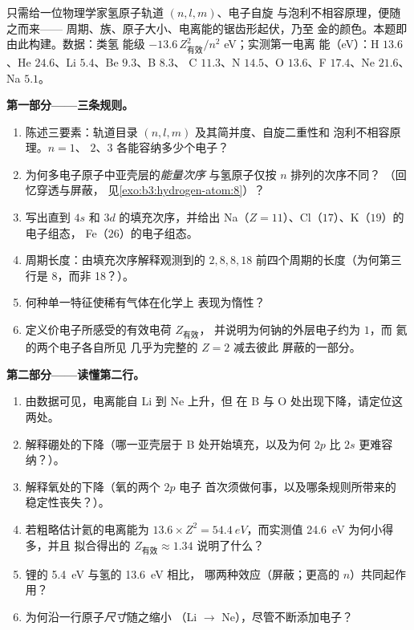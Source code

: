 \begin{problem}\label{pb:b3:identical-particles:1}
只需给一位物理学家氢原子轨道 $(n, l, m)$、电子自旋
与泡利不相容原理，便随之而来——
周期、族、原子大小、电离能的锯齿形起伏，乃至
金的颜色。本题即由此构建。数据：类氢
能级 $-13.6\,Z_{\text{有效}}^2/n^2$ eV；实测第一电离
能（eV）：H $13.6$、He $24.6$、Li $5.4$、Be $9.3$、B $8.3$、
C $11.3$、N $14.5$、O $13.6$、F $17.4$、Ne $21.6$、Na $5.1$。

\medskip\noindent\textbf{第一部分——三条规则。}
\begin{enumerate}
  \item 陈述三要素：轨道目录
        $(n, l, m)$ 及其简并度、自旋二重性和
        泡利不相容原理。$n = 1$、
        $2$、$3$ 各能容纳多少个电子？
  \item 为何多电子原子中亚壳层的\emph{能量次序}
        与氢原子仅按 $n$ 排列的次序不同？
        （回忆穿透与屏蔽，
        见\cref{exo:b3:hydrogen-atom:8}）？
  \item 写出直到 $4s$ 和 $3d$ 的填充次序，并给出
        Na（$Z = 11$）、Cl（$17$）、K（$19$）的电子组态，
        Fe（$26$）的电子组态。
  \item 周期长度：由填充次序解释观测到的 $2, 8, 8, 18$
        前四个周期的长度（为何第三行是
        8，而非 18？）。
  \item 何种单一特征使稀有气体在化学上
        表现为惰性？
  \item 定义价电子所感受的有效电荷 $Z_{\text{有效}}$，
        并说明为何钠的外层电子约为 $1$，而
        氦的两个电子各自所见
        几乎为完整的 $Z = 2$ 减去彼此
        屏蔽的一部分。
\end{enumerate}

\medskip\noindent\textbf{第二部分——读懂第二行。}
\begin{enumerate}[resume]
  \item 由数据可见，电离能自 Li 到 Ne 上升，但
        在 B 与 O 处出现下降，请定位这两处。
  \item 解释硼处的下降（哪一亚壳层于 B 处开始填充，以及为何
        $2p$ 比 $2s$ 更难容纳？）。
  \item 解释氧处的下降（氧的两个 $2p$ 电子
        首次须做何事，以及哪条规则所带来的
        稳定性丧失？）。
  \item 若粗略估计氦的电离能为
        $13.6 \times Z^2 = \qty{54.4}{eV}$，而实测值
        \qty{24.6}{eV} 为何小得多，并且
        拟合得出的 $Z_{\text{有效}} \approx 1.34$ 说明了什么？
  \item 锂的 \qty{5.4}{eV} 与氢的 \qty{13.6}{eV} 相比，
        哪两种效应（屏蔽；更高的 $n$）共同起作用？
  \item 为何沿一行原子\emph{尺寸}随之缩小
        （Li $\to$ Ne），尽管不断添加电子？
\end{enumerate}


\end{problem}
